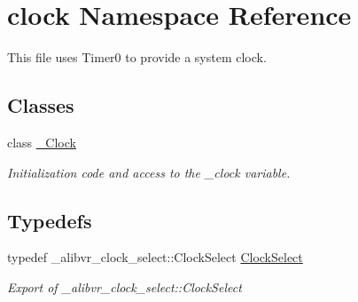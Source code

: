 \hypertarget{namespaceclock}{}\section{clock Namespace Reference}
\label{namespaceclock}


This file uses {\ttfamily Timer0} to provide a system clock.  


\subsection*{Classes}
\begin{DoxyCompactItemize}
\item 
class \hyperlink{classclock_1_1__Clock}{\+\_\+\+Clock}
\begin{DoxyCompactList}\small\item\em Initialization code and access to the \+\_\+clock variable. \end{DoxyCompactList}\end{DoxyCompactItemize}
\subsection*{Typedefs}
\begin{DoxyCompactItemize}
\item 
typedef \+\_\+alibvr\+\_\+clock\+\_\+select\+::\+Clock\+Select \hyperlink{namespaceclock_ac435d838e47eaebdb967aebfeab78eae}{Clock\+Select}\hypertarget{namespaceclock_ac435d838e47eaebdb967aebfeab78eae}{}\label{namespaceclock_ac435d838e47eaebdb967aebfeab78eae}

\begin{DoxyCompactList}\small\item\em Export of {\ttfamily \+\_\+alibvr\+\_\+clock\+\_\+select\+::\+Clock\+Select} \end{DoxyCompactList}\end{DoxyCompactItemize}
